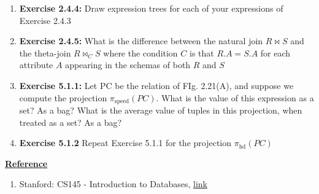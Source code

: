 \documentclass[12pt]{article}
\begin{document}
\begin{enumerate}[1.]
    \item \textbf{Exercise 2.4.4:} Draw expression trees for each of your expressions of
    Exercise 2.4.3

    \item \textbf{Exercise 2.4.5:} What is the difference between the natural join $R \bowtie S$ and the
    theta-join $R \bowtie_C S$ where the condition $C$ is that $R.A = S.A$ for
    each attribute $A$ appearing in the schemas of both $R$ and $S$

    \item \textbf{Exercise 5.1.1:} Let PC be the relation of FIg. 2.21(A), and suppose
    we compute the projection $\pi_{\text{speed}}(PC)$. What is the value of this
    expression as a set? As a bag? What is the average value of tuples in this projection,
    when treated as a set? As a bag?

    \item \textbf{Exercise 5.1.2} Repeat Exercise 5.1.1 for the projection $\pi_{\text{hd}}(PC)$
\end{enumerate}

\bigskip

\underline{\textbf{Reference}}

\bigskip

\begin{enumerate}[1)]
    \item Stanford: CS145 - Introduction to Databases, \href{http://infolab.stanford.edu/~ullman/fcdb/aut07/index.html}{link}
\end{enumerate}
\end{document}
